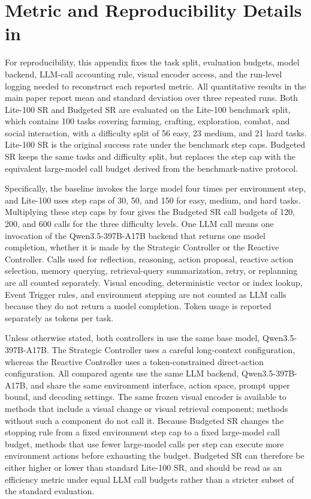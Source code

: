 \section{Metric and Reproducibility Details in \stardojo{}}
\label{sec:appendix_reproducibility}

For reproducibility, this appendix fixes the task split, evaluation budgets,
model backend, LLM-call accounting rule, visual encoder access, and the
run-level logging needed to reconstruct each reported metric.
All quantitative results in the main paper report mean and standard deviation
over three repeated runs. Both Lite-100 SR and Budgeted SR are evaluated on the
\stardojo{} Lite-100 benchmark split, which contains 100 tasks covering farming,
crafting, exploration, combat, and social interaction, with a difficulty split
of 56 easy, 23 medium, and 21 hard tasks. Lite-100 SR is the original
\stardojo{} success rate under the benchmark step caps. Budgeted SR keeps the
same tasks and difficulty split, but replaces the step cap with the equivalent
large-model call budget derived from the benchmark-native \stardojo{} protocol.

Specifically, the \stardojo{} baseline invokes the large model four times per
environment step, and Lite-100 uses step caps of 30, 50, and 150 for easy,
medium, and hard tasks. Multiplying these step caps by four gives the Budgeted
SR call budgets of 120, 200, and 600 calls for the three difficulty levels. One
LLM call means one invocation of the
Qwen3.5-397B-A17B backend that returns one model completion, whether it is made
by the Strategic Controller or the Reactive Controller. Calls used for
reflection, reasoning, action proposal, reactive action selection, memory
querying, retrieval-query summarization, retry, or replanning are all counted
separately. Visual encoding, deterministic vector or index lookup, Event Trigger
rules, and environment stepping are not counted as LLM calls because
they do not return a model completion. Token usage is reported separately as
tokens per task.

Unless otherwise stated, both controllers in \method{} use the same base model,
Qwen3.5-397B-A17B. The Strategic Controller uses a careful long-context
configuration, whereas the Reactive Controller uses a token-constrained
direct-action configuration. All compared agents use the same LLM backend,
Qwen3.5-397B-A17B, and share the same environment interface, action space,
prompt upper bound, and decoding settings. The same frozen visual encoder is
available to methods that include a visual change or visual retrieval
component; methods without such a component do not call it. Because Budgeted SR
changes the stopping rule from a fixed environment step cap to a fixed
large-model call budget, methods that use fewer large-model calls per step can
execute more environment actions before exhausting the budget. Budgeted SR can
therefore be either higher or lower than standard Lite-100 SR, and should be
read as an efficiency metric under equal LLM call budgets rather than a stricter
subset of the standard evaluation.

